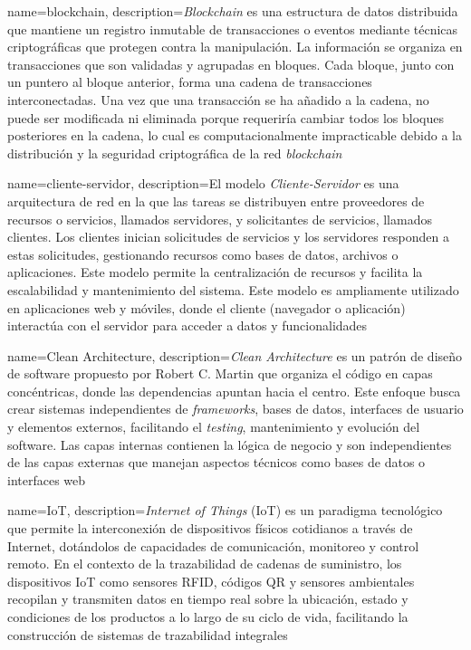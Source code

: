 
{
    name=blockchain,
    description={\textit{Blockchain} es una estructura de datos distribuida que mantiene un registro inmutable de transacciones o eventos mediante técnicas criptográficas que protegen contra la manipulación. La información se organiza en transacciones que son validadas y agrupadas en bloques. Cada bloque, junto con un puntero al bloque anterior, forma una cadena de transacciones interconectadas. Una vez que una transacción se ha añadido a la cadena, no puede ser modificada ni eliminada porque requeriría cambiar todos los bloques posteriores en la cadena, lo cual es computacionalmente impracticable debido a la distribución y la seguridad criptográfica de la red \textit{blockchain} \cite{rennock2018blockchain}}
}

{
    name=cliente-servidor,
    description={El modelo \textit{Cliente-Servidor} es una arquitectura de red en la que las tareas se distribuyen entre proveedores de recursos o servicios, llamados servidores, y solicitantes de servicios, llamados clientes. Los clientes inician solicitudes de servicios y los servidores responden a estas solicitudes, gestionando recursos como bases de datos, archivos o aplicaciones. Este modelo permite la centralización de recursos y facilita la escalabilidad y mantenimiento del sistema. Este modelo es ampliamente utilizado en aplicaciones web y móviles, donde el cliente (navegador o aplicación) interactúa con el servidor para acceder a datos y funcionalidades}
}

{
    name=Clean Architecture,
    description={\textit{Clean Architecture} es un patrón de diseño de software propuesto por Robert C. Martin que organiza el código en capas concéntricas, donde las dependencias apuntan hacia el centro. Este enfoque busca crear sistemas independientes de \textit{frameworks}, bases de datos, interfaces de usuario y elementos externos, facilitando el \textit{testing}, mantenimiento y evolución del software. Las capas internas contienen la lógica de negocio y son independientes de las capas externas que manejan aspectos técnicos como bases de datos o interfaces web}
}

{
    name=IoT,
    description={\textit{Internet of Things} (IoT) es un paradigma tecnológico que permite la interconexión de dispositivos físicos cotidianos a través de Internet, dotándolos de capacidades de comunicación, monitoreo y control remoto. En el contexto de la trazabilidad de cadenas de suministro, los dispositivos IoT como sensores RFID, códigos QR y sensores ambientales recopilan y transmiten datos en tiempo real sobre la ubicación, estado y condiciones de los productos a lo largo de su ciclo de vida, facilitando la construcción de sistemas de trazabilidad integrales}
}

